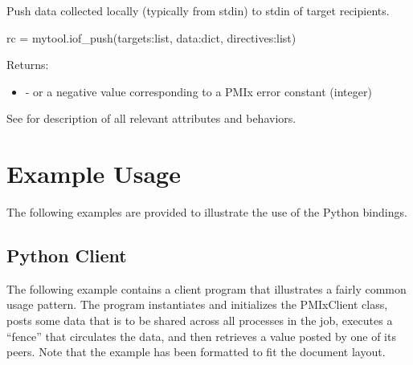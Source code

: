 Push data collected locally (typically from stdin) to
stdin of target recipients.

\format

\pyspecificstart
\begin{codepar}
rc = mytool.iof_push(targets:list, data:dict, directives:list)
\end{codepar}
\pyspecificend

\begin{arglist}
\end{arglist}

Returns:

\begin{itemize}
    \item {} -  or a negative value corresponding to a PMIx error constant (integer)
\end{itemize}

See  for description of all relevant attributes and behaviors.


\section{Example Usage}
\label{app:python:examples}

The following examples are provided to illustrate the use of the Python bindings.

\subsection{Python Client}

The following example contains a client program that illustrates a fairly common usage pattern. The program instantiates and initializes the PMIxClient class, posts some data that is to be shared across all processes in the job, executes a “fence” that circulates the data, and then retrieves a value posted by one of its peers. Note that the example has been formatted to fit the document layout.


